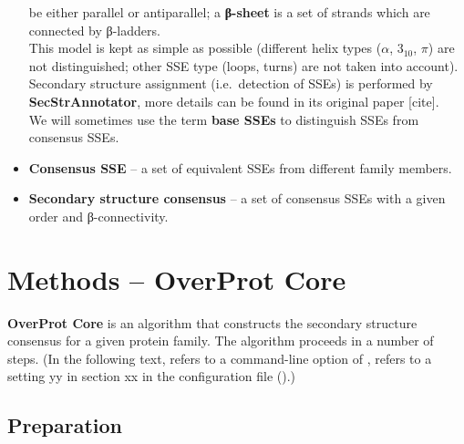 \documentclass{article}
\begin{document}
\begin{itemize}
    be either parallel or antiparallel; a \textbf{β-sheet} is a set of
    strands which are connected by β-ladders.\\
    This model is kept as simple as possible (different helix types
    (\(\alpha\), \(3_{10}\), \(\pi\)) are not distinguished; other SSE
    type (loops, turns) are not taken into account). Secondary structure
    assignment (i.e.~detection of SSEs) is performed by
    \textbf{SecStrAnnotator}, more details can be found in its original
    paper {[}cite{]}.\\
    We will sometimes use the term \textbf{base SSEs} to distinguish SSEs from consensus SSEs.
  \item
    \textbf{Consensus SSE} -- a set of equivalent SSEs from different
    family members. 
  \item
    \textbf{Secondary structure consensus} -- a set of consensus SSEs
    with a given order and β-connectivity.
\end{itemize}

    


\section{Methods -- OverProt Core}

\textbf{OverProt Core} is an algorithm that constructs the secondary
structure consensus for a given protein family. The algorithm proceeds
in a number of steps. 
(In the following text,  refers to a command-line option of ,
 refers to a setting yy in section xx in the configuration file ().)



\subsection{Preparation}
\end{document}
